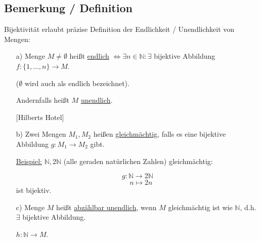 \documentclass[a4paper, 12pt, twoside] {article}
\begin{document}
\subsection{Bemerkung / Definition}

Bijektivität erlaubt präzise Definition der Endlichkeit / Unendlichkeit von Mengen:

\begin{itemize}
\item[a)] Menge $M \neq \emptyset$ heißt \underline{endlich} $\Leftrightarrow \exists n \in \mathbb{N} : \exists$ bijektive Abbildung $f \colon \{1,...,n\} \to M$.

($\emptyset$ wird auch als endlich bezeichnet).

Andernfalls heißt $M$ \underline{unendlich}.

[Hilberts Hotel]

\item[b)] Zwei Mengen $M_1, M_2$ heißen \underline{gleichmächtig}, falls es eine bijektive Abbildung $g \colon M_1 \rightarrow M_2$ gibt.

\underline{Beispiel:} $\mathbb{N}, 2\mathbb{N}$ (alle geraden natürlichen Zahlen) gleichmächtig:

$$g \colon \mathbb{N} \to 2\mathbb{N}$$
$$\quad n \mapsto 2n$$ \hfill ist bijektiv.




\item[c)] Menge $M$ heißt \underline{abzählbar unendlich}, wenn $M$ gleichmächtig ist wie $\mathbb{N}$, d.h. $\exists$ bijektive Abbildung.

$h \colon \mathbb{N} \rightarrow M$.

\end{itemize}
\end{document}
